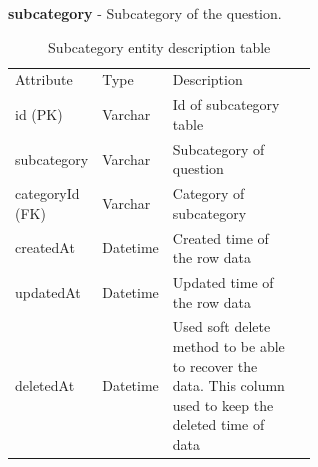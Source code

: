 \documentclass[12pt,oneside,openright,a4paper]{cpe-english-project}
\begin{document}
\textbf{subcategory} - Subcategory of the question.
\begin{table}[ht]
	\caption{Subcategory entity description table}
	\label{tab:Subcategory entity description table}
\begin{adjustbox}{width=\textwidth}
\begin{tabular}{llp{0.6\linewidth}l}
\rowcolor[HTML]{5B9BD5} 
Attribute       & Type     & Description                                                                                                   \\
\rowcolor[HTML]{DEEAF6} 
id (PK)         & Varchar  & Id of subcategory table                                                                                       \\
subcategory     & Varchar  & Subcategory of question                                                                                       \\
\rowcolor[HTML]{DEEAF6} 
categoryId (FK) & Varchar  & Category of subcategory                                                                                       \\
createdAt       & Datetime & Created time of the row   data                                                                                \\
\rowcolor[HTML]{DEEAF6} 
updatedAt       & Datetime & Updated time of the row data                                                                                  \\
deletedAt       & Datetime & Used soft delete method   to be able to recover the data. This column used to keep the deleted time of   data
\end{tabular}
\end{adjustbox}
\end{table}
\end{document}

